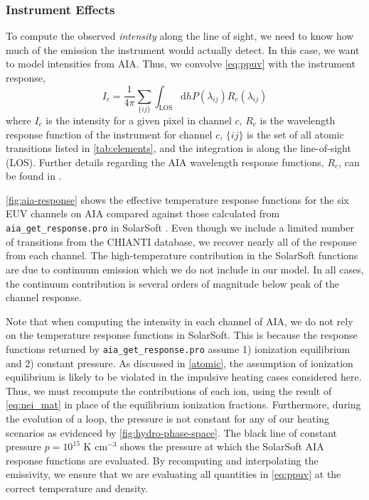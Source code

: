 \subsubsection{Instrument Effects}\label{instrument}

To compute the observed \textit{intensity} along the line of sight, we need to know how much of the emission the instrument would actually detect. In this case, we want to model intensities from AIA. Thus, we convolve \autoref{eq:ppuv} with the instrument response,
\begin{equation}\label{eq:intensity}
    I_c = \frac{1}{4\pi}\sum_{\{ij\}}\int_{\text{LOS}}\mathrm{d}hP(\lambda_{ij})R_c(\lambda_{ij})
\end{equation}
where $I_c$ is the intensity for a given pixel in channel $c$, $R_c$ is the wavelength response function of the instrument for channel $c$, $\{ij\}$ is the set of all atomic transitions listed in \autoref{tab:elements}, and the integration is along the line-of-sight (LOS). Further details regarding the AIA wavelength response functions, $R_c$, can be found in \citet{boerner_initial_2012}.

\autoref{fig:aia-response} shows the effective temperature response functions for the six EUV channels on AIA compared against those calculated from \texttt{aia\_get\_response.pro} in SolarSoft \citep{freeland_data_1998}. Even though we include a limited number of transitions from the CHIANTI database, we recover nearly all of the response from each channel. The high-temperature contribution in the SolarSoft functions are due to continuum emission which we do not include in our model. In all cases, the continuum contribution is several orders of magnitude below peak of the channel response.

Note that when computing the intensity in each channel of AIA, we do not rely on the temperature response functions in SolarSoft. This is because the response functions returned by \texttt{aia\_get\_response.pro} assume 1) ionization equilibrium and 2) constant pressure. As discussed in \autoref{atomic}, the assumption of ionization equilibrium is likely to be violated in the impulsive heating cases considered here. Thus, we must recompute the contributions of each ion, using the result of \autoref{eq:nei_mat} in place of the equilibrium ionization fractions. Furthermore, during the evolution of a loop, the pressure is not constant for any of our heating scenarios as evidenced by \autoref{fig:hydro-phase-space}. The black line of constant pressure $p=10^{15}$ K cm$^{-3}$ shows the pressure at which the SolarSoft AIA response functions are evaluated. By recomputing and interpolating the emissivity, we ensure that we are evaluating all quantities in \autoref{eq:ppuv} at the correct temperature and density. 


